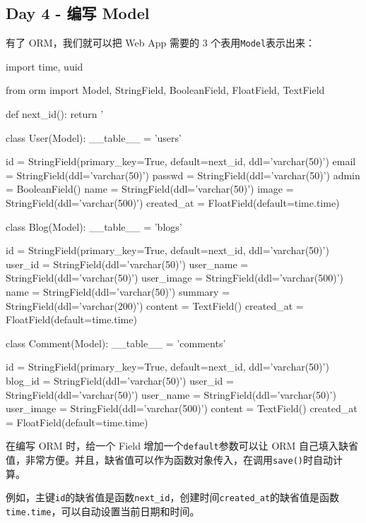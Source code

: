 \hypertarget{day-4---ux7f16ux5199-model}{%
\subsection{Day 4 - 编写 Model}\label{day-4---ux7f16ux5199-model}}

有了 ORM，我们就可以把 Web App 需要的 3 个表用\texttt{Model}表示出来：

\begin{pythoncode}
import time, uuid

from orm import Model, StringField, BooleanField, FloatField, TextField

def next_id():
    return '%

class User(Model):
    __table__ = 'users'

    id = StringField(primary_key=True, default=next_id, ddl='varchar(50)')
    email = StringField(ddl='varchar(50)')
    passwd = StringField(ddl='varchar(50)')
    admin = BooleanField()
    name = StringField(ddl='varchar(50)')
    image = StringField(ddl='varchar(500)')
    created_at = FloatField(default=time.time)

class Blog(Model):
    __table__ = 'blogs'

    id = StringField(primary_key=True, default=next_id, ddl='varchar(50)')
    user_id = StringField(ddl='varchar(50)')
    user_name = StringField(ddl='varchar(50)')
    user_image = StringField(ddl='varchar(500)')
    name = StringField(ddl='varchar(50)')
    summary = StringField(ddl='varchar(200)')
    content = TextField()
    created_at = FloatField(default=time.time)

class Comment(Model):
    __table__ = 'comments'

    id = StringField(primary_key=True, default=next_id, ddl='varchar(50)')
    blog_id = StringField(ddl='varchar(50)')
    user_id = StringField(ddl='varchar(50)')
    user_name = StringField(ddl='varchar(50)')
    user_image = StringField(ddl='varchar(500)')
    content = TextField()
    created_at = FloatField(default=time.time)
\end{pythoncode}

在编写 ORM 时，给一个 Field 增加一个\texttt{default}参数可以让 ORM
自己填入缺省值，非常方便。并且，缺省值可以作为函数对象传入，在调用\texttt{save()}时自动计算。

例如，主键\texttt{id}的缺省值是函数\texttt{next\_id}，创建时间\texttt{created\_at}的缺省值是函数\texttt{time.time}，可以自动设置当前日期和时间。

